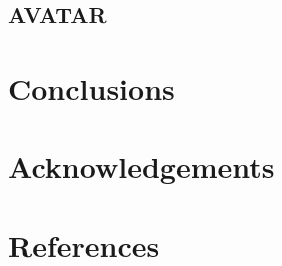 \documentclass[review]{elsarticle}
\numberwithin{equation}{section}
\newcommand{\myreferences}{./Bibliography/references,./Bibliography/Mendeley_refs}
\numberwithin{equation}{section}
\begin{document}
\subsection{AVATAR}

\section{Conclusions}\label{sec:conclusions}

\section*{Acknowledgements}

\newpage

\section{References}


\newpage

\appendix

\end{document}
